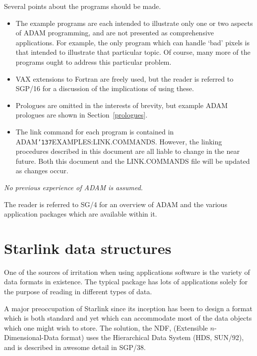 \documentclass[twoside,11pt]{article}
\renewcommand{\_}{{\tt\char'137}}
\newcommand{\xref}[3]{#1}
\newcommand{\xlabel}[1]{}
\begin{document}
Several points about the programs should be made.
\begin{itemize}
\item The example programs are each intended to illustrate
only one or two aspects of ADAM programming, and are not presented as
comprehensive applications.
For example, the only program which can handle `bad' pixels is that intended
to illustrate that particular topic. Of course, many more of the programs
ought to address this particular problem.

\item VAX extensions to Fortran are freely used, but the reader is referred to
\xref{SGP/16}{sgp16}{} for a discussion of the implications of using these.

\item Prologues are omitted in the interests of brevity, but example ADAM
prologues are shown in Section~\ref{prologues}.

\item The link command for each program is contained in
ADAM\_EXAMPLES:LINK.COMMANDS. However, the linking procedures described in this
document are all liable to change in the near future. Both this document and
the LINK.COMMANDS file will be updated as changes occur.

\end{itemize}

{\sl No previous experience of ADAM is assumed.}

The reader is referred to \xref{SG/4}{sg4}{} for an overview of ADAM and the
various application packages which are available within it.

\newpage
\section{Starlink data structures\label{ndf}\xlabel{starlink_data_structures}}

One of the sources of irritation when using applications software is the
variety of data formats in existence.
The typical package has lots of applications solely for the
purpose of reading in different types of data.

A major preoccupation of Starlink since its inception has been to
design a format which
is both standard and yet which can accommodate most of the
data objects which one might wish to store.
The solution,  the NDF, (Extensible $n$-Dimensional-Data format) uses
the Hierarchical Data System (HDS, \xref{SUN/92}{sun92}{}), and is described
in awesome detail in \xref{SGP/38}{sgp38}{}.
\end{document}
